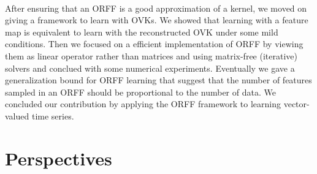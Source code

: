 \begin{justify}
    \paragraph{}
    After ensuring that an \acs{ORFF} is a good approximation of a kernel, we
    moved on giving a framework to learn with \aclp{OVK}. We showed that
    learning with a feature map is equivalent to learn with the reconstructed
    \acs{OVK} under some mild conditions. Then we focused on a efficient
    implementation of \acs{ORFF} by viewing them as linear operator rather than
    matrices and using matrix-free (iterative) solvers and conclued with some
    numerical experiments. Eventually we gave a generalization bound for
    \acs{ORFF} learning that suggest that the number of features sampled in an
    \acs{ORFF} should be proportional to the number of data. We concluded our
    contribution by applying the \acs{ORFF} framework to learning vector-valued
    time series.
    \section{Perspectives}
\end{justify}
\label{ch:conclusion}

